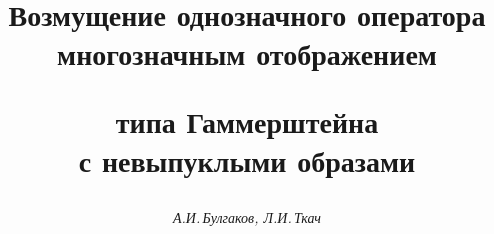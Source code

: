 




% 


\newcommand{\co}{\operatorname{co}}


\newcommand{\ext}{\operatorname{ext}}


\newcommand{\comp}{\operatorname{comp}}







 


\setcounter{page}{3}















\author{\it А.И.\,Булгаков, Л.И.\,Ткач }




\title{Возмущение однозначного оператора\\ многозначным отображением


типа Гаммерштейна\\ с невыпуклыми образами}





\date{}




\pagestyle{plain} %







\maketitle


